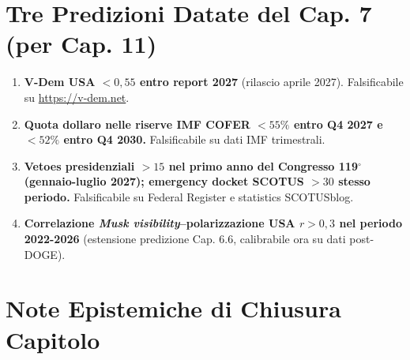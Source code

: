 \section{Tre Predizioni Datate del Cap. 7 (per Cap.
11)}\label{tre-predizioni-datate-del-cap.-7-per-cap.-11}

\begin{enumerate}
\def\labelenumi{\arabic{enumi}.}
\tightlist
\item
  \textbf{V-Dem USA \(< 0{,}55\) entro report 2027} (rilascio aprile
  2027). Falsificabile su \url{https://v-dem.net}.
\item
  \textbf{Quota dollaro nelle riserve IMF COFER \(< 55\%\) entro Q4 2027
  e \(< 52\%\) entro Q4 2030.} Falsificabile su dati IMF trimestrali.
\item
  \textbf{Vetoes presidenziali \(> 15\) nel primo anno del Congresso
  119$^\circ$ (gennaio-luglio 2027); emergency docket SCOTUS \(> 30\) stesso
  periodo.} Falsificabile su Federal Register e statistics SCOTUSblog.
\item
  \textbf{Correlazione \emph{Musk visibility}--polarizzazione USA
  \(r > 0{,}3\) nel periodo 2022-2026} (estensione predizione Cap. 6.6,
  calibrabile ora su dati post-DOGE).
\end{enumerate}



\section{Note Epistemiche di Chiusura
Capitolo}\label{note-epistemiche-di-chiusura-capitolo}

